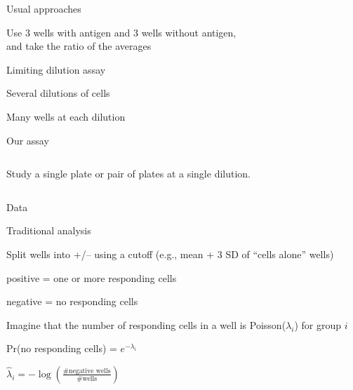 \documentclass[aspectratio=169,12pt,t]{beamer}
\begin{document}
\begin{frame}{Usual approaches}

  \bbi

\item Use 3 wells with antigen and 3 wells without antigen,\\
  and take the ratio of the averages

  \item Limiting dilution assay
    \bi
  \item Several dilutions of cells
  \item Many wells at each dilution
    \ei
    \ei

\end{frame}


\begin{frame}[c]{Our assay}

  \begin{columns}[c]
    Study a single plate or pair of plates at a single dilution.



  \end{columns}


\end{frame}

\begin{frame}[c]{Data}
\end{frame}


\begin{frame}[c]{Traditional analysis}
  \bbi
  \item Split wells into +/-- using a cutoff (e.g., mean + 3 SD of
    ``cells alone'' wells)
    \bi
  \item[] positive = one or more responding cells
  \item[] negative = no responding cells
    \ei

  \item Imagine that the number of responding cells in a well is
    Poisson($\lambda_i$) for group $i$

    \vspace{4mm}

  \qquad Pr(no responding cells) = $e^{-\lambda_i}$

    \vspace{4mm}

  \qquad $\hat{\lambda}_i = -\log\left(\frac{\text{\# negative wells}}{\text{\# wells}}\right)$

    \ei

\end{frame}
\end{document}

